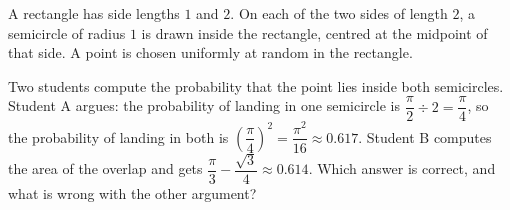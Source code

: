 A rectangle has side lengths $1$ and $2$. On each of the two sides of length $2$, a semicircle of radius $1$ is drawn inside the rectangle, centred at the midpoint of that side. A point is chosen uniformly at random in the rectangle.

Two students compute the probability that the point lies inside both semicircles. Student A argues: the probability of landing in one semicircle is $\dfrac{\pi}{2}\div2=\dfrac{\pi}{4}$, so the probability of landing in both is $\left(\dfrac{\pi}{4}\right)^2=\dfrac{\pi^2}{16}\approx0.617$. Student B computes the area of the overlap and gets $\dfrac{\pi}{3}-\dfrac{\sqrt3}{4}\approx0.614$. Which answer is correct, and what is wrong with the other argument?
